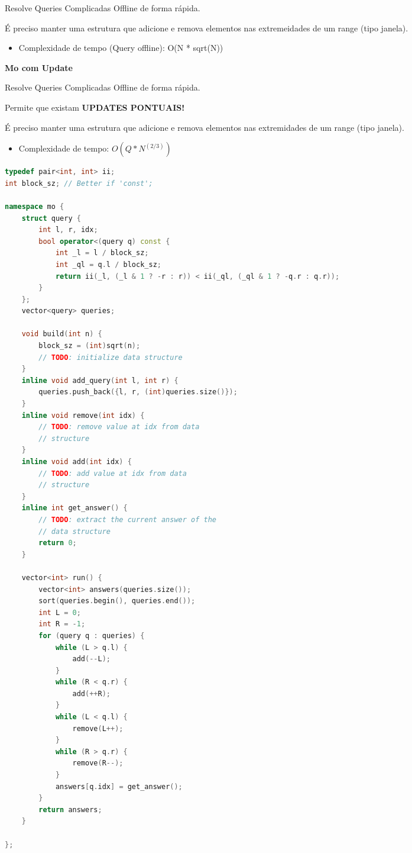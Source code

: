 \documentclass[11pt, a4paper, oneside]{book}
\begin{document}
Resolve Queries Complicadas Offline de forma rápida.  



É preciso manter uma estrutura que adicione e remova elementos nas extremeidades de um range (tipo janela).



\begin{itemize}
\item Complexidade de tempo (Query offline): O(N * sqrt(N))
\end{itemize}



\textbf{Mo com Update} 



Resolve Queries Complicadas Offline de forma rápida.   

Permite que existam \textbf{UPDATES PONTUAIS!}  

É preciso manter uma estrutura que adicione e remova elementos nas extremidades de um range (tipo janela).



\begin{itemize}
\item Complexidade de tempo: $O(Q * N^(2/3))$
\end{itemize}

\hfill

\begin{multicols}{2}
\begin{lstlisting}[language=C++]
typedef pair<int, int> ii;
int block_sz; // Better if 'const';

namespace mo {
    struct query {
        int l, r, idx;
        bool operator<(query q) const {
            int _l = l / block_sz;
            int _ql = q.l / block_sz;
            return ii(_l, (_l & 1 ? -r : r)) < ii(_ql, (_ql & 1 ? -q.r : q.r));
        }
    };
    vector<query> queries;

    void build(int n) {
        block_sz = (int)sqrt(n);
        // TODO: initialize data structure
    }
    inline void add_query(int l, int r) {
        queries.push_back({l, r, (int)queries.size()});
    }
    inline void remove(int idx) {
        // TODO: remove value at idx from data
        // structure
    }
    inline void add(int idx) {
        // TODO: add value at idx from data
        // structure
    }
    inline int get_answer() {
        // TODO: extract the current answer of the
        // data structure
        return 0;
    }

    vector<int> run() {
        vector<int> answers(queries.size());
        sort(queries.begin(), queries.end());
        int L = 0;
        int R = -1;
        for (query q : queries) {
            while (L > q.l) {
                add(--L);
            }
            while (R < q.r) {
                add(++R);
            }
            while (L < q.l) {
                remove(L++);
            }
            while (R > q.r) {
                remove(R--);
            }
            answers[q.idx] = get_answer();
        }
        return answers;
    }

};
\end{lstlisting}
\end{multicols}
\end{document}
